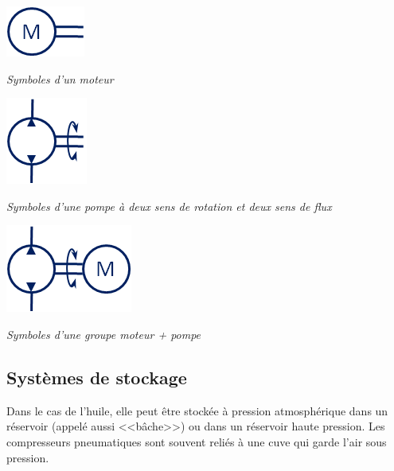 \documentclass[10pt]{article}
\begin{document}
\begin{minipage}[b]{.3\textwidth}
\begin{center}
\includegraphics[width=.3\textwidth]{images/Symb_Moteur}

\textit{Symboles d'un moteur}
\end{center}
\end{minipage}\hfill
\begin{minipage}[b]{.3\textwidth}
\begin{center}
\includegraphics[width=.3\textwidth]{images/Symb_Pompe2}

\textit{Symboles d'une pompe à deux sens de rotation et deux sens de flux}
\end{center}
\end{minipage}\hfill
\begin{minipage}[b]{.3\textwidth}
\begin{center}
\includegraphics[width=.3\textwidth]{images/Symb_MotoPompe}

\textit{Symboles d'une groupe moteur + pompe}
\end{center}
\end{minipage}

\subsection{Systèmes de stockage}
Dans le cas de l'huile, elle peut être stockée à pression atmosphérique dans un réservoir (appelé aussi <<bâche>>) ou dans un réservoir haute pression. 
Les compresseurs pneumatiques sont souvent reliés à une cuve qui garde l'air sous pression. 
\end{document}
